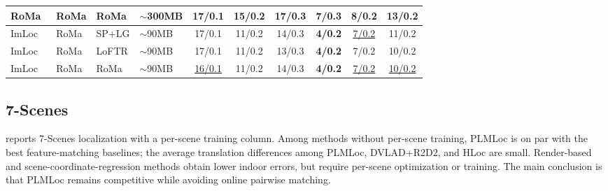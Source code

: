 \documentclass[letterpaper,10 pt,conference]{ieeeconf}
\newcommand{\method}{PLMLoc}
\begin{document}
\begin{table}[!t]
\begin{adjustbox}{max width=\textwidth}
\begin{tabular}{@{}llllcccccc@{}}
        RoMa~\cite{edstedt2024roma} & RoMa & RoMa & $\sim$300MB & 17/0.1 & 15/0.2 & 17/0.3 & 7/0.3 & 8/0.2 & 13/0.2 \\
        \midrule
        ImLoc~\cite{jiang2026imloc} & RoMa & SP+LG & $\sim$90MB & 17/0.1 & 11/0.2 & 14/0.3 & \textbf{4/0.2} & \underline{7/0.2} & 11/0.2 \\
        ImLoc~\cite{jiang2026imloc} & RoMa & LoFTR & $\sim$90MB & 17/0.1 & 11/0.2 & 13/0.3 & \textbf{4/0.2} & 7/0.2 & 10/0.2 \\
        ImLoc~\cite{jiang2026imloc} & RoMa & RoMa & $\sim$90MB & \underline{16/0.1} & 11/0.2 & 14/0.3 & \textbf{4/0.2} & \underline{7/0.2} & \underline{10/0.2} \\
        \bottomrule
    \end{tabular}
    \end{adjustbox}
\end{table}

\subsection{7-Scenes}

 reports 7-Scenes localization with a per-scene training column. Among methods without per-scene training, \method{} is on par with the best feature-matching baselines; the average translation differences among \method{}, DVLAD+R2D2, and HLoc are small. Render-based and scene-coordinate-regression methods obtain lower indoor errors, but require per-scene optimization or training. The main conclusion is that \method{} remains competitive while avoiding online pairwise matching.
\end{document}
